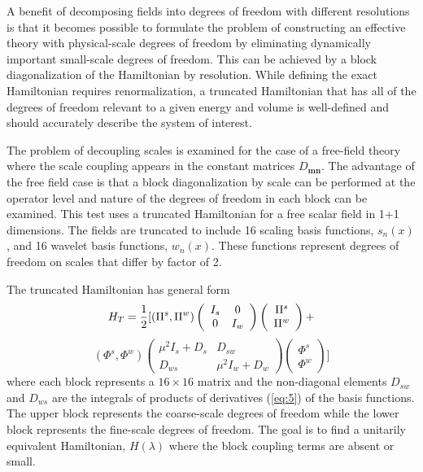 \documentclass[aps,prc,reprint,showpacs,groupedaddress,onecolumn]{revtex4}
\begin{document}
A benefit of decomposing fields into degrees of freedom with different
resolutions is that it becomes possible to formulate the problem of
constructing an effective theory with physical-scale degrees of
freedom by eliminating dynamically important small-scale degrees of
freedom.  This can be achieved by a block diagonalization of the
Hamiltonian by resolution.  While defining the exact Hamiltonian
requires renormalization, a truncated Hamiltonian that has all of the
degrees of freedom relevant to a given energy and volume is
well-defined and should accurately describe the system of interest.

The problem of decoupling scales is examined for the case of a 
free-field theory where the scale coupling appears in the constant matrices
$D_{\mathbf{m}\mathbf{n}}$.  The advantage of the free field case is
that a block diagonalization by scale can be performed at the operator
level and nature of the degrees of freedom in each block can be
examined.  This test uses a truncated Hamiltonian for a free scalar
field in 1+1 dimensions.  The fields are truncated to include 16
scaling basis functions, $s_n(x)$, and 16 wavelet basis functions,
$w_n(x)$.  These functions represent degrees of freedom on scales
that differ by factor of 2.

The truncated Hamiltonian has general form 
\[
H_T = {1 \over 2} 
[
(\Pi^s ,\Pi^w) 
\left (
\begin{array}{cc}
I_s & 0\\
0 & I_w 
\end{array}
\right ) 
\left (
\begin{array}{c}
\Pi^s \\
\Pi^w  
\end{array}
\right ) +
\]
\[
(\Phi^s ,\Phi^w) 
\left (
\begin{array}{cc}
\mu^2I_s+D_{s} & {D_{sw}}\\
{D_{ws}}  & \mu^2I_w + D_{w} 
\end{array}
\right ) 
\left (
\begin{array}{c}
\Phi^s \\
\Phi^w  
\end{array}
\right ) 
]
\]
where each block represents a $16\times 16$ matrix and 
the non-diagonal elements $D_{sw}$ and $D_{ws}$ are the
integrals of products of derivatives (\ref{eq:5}) of the basis functions.  The
upper block represents the coarse-scale degrees of freedom while the
lower block represents the fine-scale degrees of freedom.  The goal is
to find a unitarily equivalent Hamiltonian, $H(\lambda)$ 
where the block coupling
terms are absent or small.
 
\end{document}
